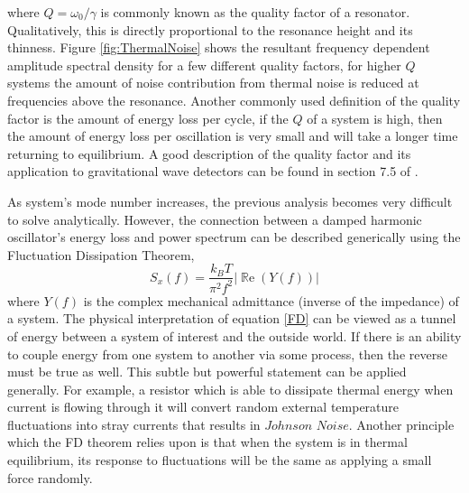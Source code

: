		where $Q=\omega_{0}/\gamma$ is commonly known as the quality factor of a resonator.  Qualitatively, this is directly proportional to the resonance height and its thinness.  Figure \ref{fig:ThermalNoise} shows the resultant frequency dependent amplitude spectral density for a few different quality factors, for higher $Q$ systems the amount of noise contribution from thermal noise is reduced at frequencies above the resonance.  Another commonly used definition of the quality factor is the amount of energy loss per cycle, if the $Q$ of a system is high, then the amount of energy loss per oscillation is very small and will take a longer time returning to equilibrium.  A good description of the quality factor and its application to gravitational wave detectors can be found in section 7.5 of \cite{Saulson}.
		
		As system's mode number increases, the previous analysis becomes very difficult to solve analytically. However, the connection between a damped harmonic oscillator's energy loss and power spectrum can be described generically using the Fluctuation Dissipation Theorem,
		\begin{equation}\label{FD}
		S_x(f) = \frac{k_B T}{\pi^2 f^2} \vert \operatorname{\mathbb{R}e} (Y(f)) \vert
		\end{equation}
		where $Y(f)$ is the complex mechanical admittance (inverse of the impedance) of a system. The physical interpretation of equation \ref{FD} can be viewed as a tunnel of energy between a system of interest and the outside world.  If there is an ability to couple energy from one system to another via some process, then the reverse must be true as well. This subtle but powerful statement can be applied generally.  For example, a resistor which is able to dissipate thermal energy when current is flowing through it will convert random external temperature fluctuations into stray currents that results in $Johnson$ $Noise$.  Another principle which the FD theorem relies upon is that when the system is in thermal equilibrium, its response to fluctuations will be the same as applying a small force randomly.
		
